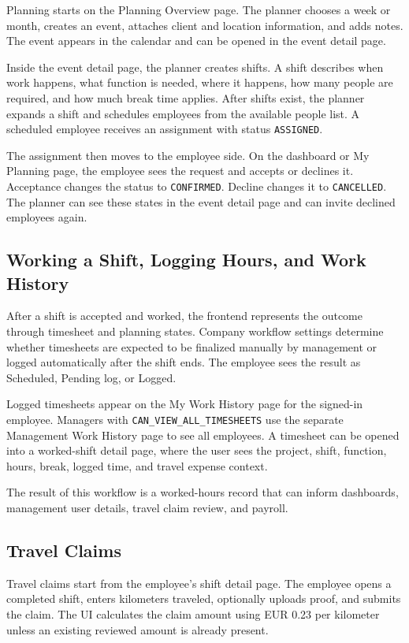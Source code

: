 \documentclass[11pt]{article}
\newcommand{\code}[1]{\nolinkurl{#1}}
\begin{document}
Planning starts on the Planning Overview page. The planner chooses a week or month, creates an event, attaches client and location information, and adds notes. The event appears in the calendar and can be opened in the event detail page.

Inside the event detail page, the planner creates shifts. A shift describes when work happens, what function is needed, where it happens, how many people are required, and how much break time applies. After shifts exist, the planner expands a shift and schedules employees from the available people list. A scheduled employee receives an assignment with status \code{ASSIGNED}.

The assignment then moves to the employee side. On the dashboard or My Planning page, the employee sees the request and accepts or declines it. Acceptance changes the status to \code{CONFIRMED}. Decline changes it to \code{CANCELLED}. The planner can see these states in the event detail page and can invite declined employees again.

\subsection{Working a Shift, Logging Hours, and Work History}

After a shift is accepted and worked, the frontend represents the outcome through timesheet and planning states. Company workflow settings determine whether timesheets are expected to be finalized manually by management or logged automatically after the shift ends. The employee sees the result as Scheduled, Pending log, or Logged.

Logged timesheets appear on the My Work History page for the signed-in employee. Managers with \code{CAN_VIEW_ALL_TIMESHEETS} use the separate Management Work History page to see all employees. A timesheet can be opened into a worked-shift detail page, where the user sees the project, shift, function, hours, break, logged time, and travel expense context.

The result of this workflow is a worked-hours record that can inform dashboards, management user details, travel claim review, and payroll.

\subsection{Travel Claims}

Travel claims start from the employee's shift detail page. The employee opens a completed shift, enters kilometers traveled, optionally uploads proof, and submits the claim. The UI calculates the claim amount using EUR 0.23 per kilometer unless an existing reviewed amount is already present.
\end{document}
